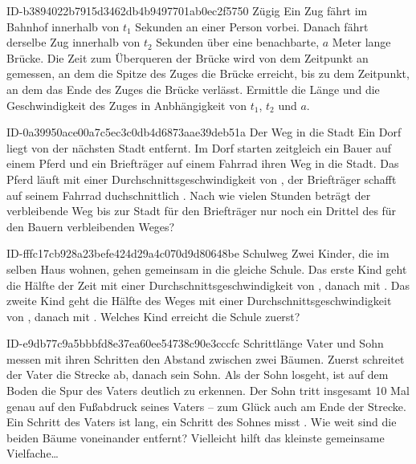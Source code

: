 \begin{exercise}
      {ID-b3894022b7915d3462db4b9497701ab0ec2f5750}
      {Zügig}
  \ifproblem\problem
    Ein Zug fährt im Bahnhof innerhalb von $t_{1}$ Sekunden an einer Person vorbei.
    Danach fährt derselbe Zug innerhalb von $t_{2}$ Sekunden über eine benachbarte,
    $a$ Meter lange Brücke. Die Zeit zum Überqueren der Brücke wird von dem Zeitpunkt
    an gemessen, an dem die Spitze des Zuges die Brücke erreicht, bis zu dem
    Zeitpunkt, an dem das Ende des Zuges die Brücke verlässt.
    Ermittle die Länge und die Geschwindigkeit des Zuges in Anbhängigkeit von $t_{1}$,
    $t_{2}$ und $a$.
  \fi
\end{exercise}

\begin{exercise}
      {ID-0a39950ace00a7c5ec3c0db4d6873aae39deb51a}
      {Der Weg in die Stadt}
  \ifproblem\problem
    Ein Dorf liegt  von der nächsten Stadt entfernt. Im Dorf starten zeitgleich
    ein Bauer auf einem Pferd und ein Briefträger auf einem Fahrrad ihren Weg in die Stadt.
    Das Pferd läuft mit einer Durchschnittsgeschwindigkeit von , der Briefträger
    schafft auf seinem Fahrrad duchschnittlich . Nach wie vielen Stunden beträgt
    der verbleibende Weg bis zur Stadt für den Briefträger nur noch ein Drittel des für
    den Bauern verbleibenden Weges?
  \fi
\end{exercise}

\begin{exercise}
      {ID-fffc17cb928a23befe424d29a4c070d9d80648be}
      {Schulweg}
  \ifproblem\problem
    Zwei Kinder, die im selben Haus wohnen, gehen gemeinsam in die gleiche
    Schule. Das erste Kind geht die Hälfte der Zeit mit einer
    Durchschnittsgeschwindigkeit von , danach mit . Das
    zweite Kind geht die Hälfte des Weges mit einer Durchschnittsgeschwindigkeit
    von , danach mit . Welches Kind erreicht die Schule
    zuerst?
  \fi
\end{exercise}

\begin{exercise}
      {ID-e9db77c9a5bbbfd8e37ea60ee54738c90e3cccfc}
      {Schrittlänge}
  \ifproblem\problem
    Vater und Sohn messen mit ihren Schritten den Abstand zwischen zwei Bäumen.
    Zuerst schreitet der Vater die Strecke ab, danach sein Sohn. Als der Sohn
    losgeht, ist auf dem Boden die Spur des Vaters deutlich zu erkennen.
    Der Sohn tritt insgesamt 10 Mal genau auf den Fußabdruck seines Vaters --
    zum Glück auch am Ende der Strecke. Ein Schritt des Vaters ist 
    lang, ein Schritt des Sohnes misst . Wie weit sind die beiden
    Bäume voneinander entfernt?
  \fi
  \ifoutline\outline
    Vielleicht hilft das kleinste gemeinsame Vielfache\ldots
  \fi
\end{exercise}

